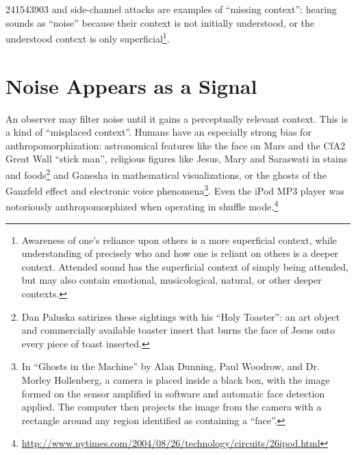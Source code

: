 \documentclass{thesis}
\begin{document}
241543903 and side-channel attacks are examples of ``missing context'': hearing sounds as ``noise'' because their context is not initially understood, or the understood context is only superficial\footnote{Awareness of one's reliance upon others is a more superficial context, while understanding of precisely who and how one is reliant on others is a deeper context. Attended sound has the superficial context of simply being attended, but may also contain emotional, musicological, natural, or other deeper contexts.}.

\section{Noise Appears as a Signal}

An observer may filter noise until it gains a perceptually relevant context. This is a kind of ``misplaced context''. Humans have an especially strong bias for anthropomorphization: astronomical features like the face on Mars\cite{brian_dunning_facemars_2008} and the CfA2 Great Wall ``stick man''\cite{de_lapparent_slice_1986}, religious figures like Jesus, Mary and Saraswati in stains and foods\cite{boston.com_religious_????}\footnote{Dan Paluska satirizes these sightings with his ``Holy Toaster''\cite{dan_paluska_holy_2005}: an art object and commercially available toaster insert that burns the face of Jesus onto every piece of toast inserted.} and Ganesha in mathematical visualizations\cite{melinda_green_buddhabrot_1993}, or the ghosts of the Ganzfeld effect and electronic voice phenomena\footnote{In ``Ghosts in the Machine'' by Alan Dunning, Paul Woodrow, and Dr. Morley Hollenberg\cite{alan_dunning_paul_woodrow_and_morley_hollenberg_einsteins_2008}, a camera is placed inside a black box, with the image formed on the sensor amplified in software and automatic face detection applied. The computer then projects the image from the camera with a rectangle around any region identified as containing a ``face''.}. Even the iPod MP3 player was notoriously anthropomorphized when operating in shuffle mode.\footnote{\url{http://www.nytimes.com/2004/08/26/technology/circuits/26ipod.html}}
\end{document}
